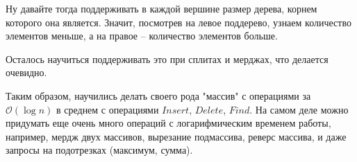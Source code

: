 \documentclass[fleqn, 12pt]{article}
\newcommand{\bigo}{\mathcal{O}}
\begin{document}
Ну давайте тогда поддерживать в каждой вершине размер дерева, корнем которого она является. Значит, посмотрев на левое поддерево, узнаем количество элементов меньше, а на правое -- количество элементов больше. 

Осталось научиться поддерживать это при сплитах и мерджах, что делается очевидно. 

Таким образом, научились делать своего рода "массив" с операциями за $ \bigo(\log n) $ в среднем с операциями $ Insert $, $ Delete $, $ Find $. На самом деле можно придумать еще очень много операций с логарифмическим временем работы, например, мердж двух массивов, вырезание подмассива, реверс массива, и даже запросы на подотрезках (максимум, сумма). 
\end{document}
